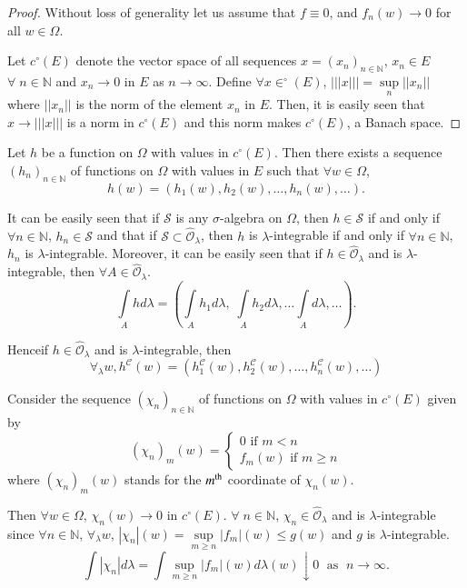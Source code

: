 \begin{proof}
Without loss of generality let us assume that $f\equiv 0$, and $f_n(w)
\to 0$ for all $w \in\Omega$. 

Let $c^\circ (E)$ denote the vector space of all sequences $x =
(x_n)_{n \in \mathbb{N}}$, $x_n \in E$ $\forall \; n \in \mathbb{N}$
and $x_n \to 0$ in $E$ as $n \to \infty$. Define $\forall x \in^\circ
(E)$, $||| x||| = \sup\limits_{n}||x_n||$ where $||x_n||$ is the norm
of the element $x_n$ in $E$. Then, it is easily seen that $x \to
|||x|||$ is a norm in $c^\circ(E)$ and this norm makes $c^\circ(E)$, a
Banach space. 
\end{proof}

Let $h$ be a function on $\Omega$ with values in $c^\circ(E)$. Then
there exists a sequence $(h_n)_{n \in \mathbb{N}}$ of functions on
$\Omega$ with values in $E$ such that $\forall w \in \Omega$, 
$$
h(w) = (h_1 (w), h_2 (w), \ldots, h_n(w), \ldots). 
$$

It can be easily seen that if $\mathcal{S}$ is any $\sigma$-algebra on
$\Omega$, then $h \in \mathcal{S}$ if and only if $\forall n \in
\mathbb{N}$, $h_n \in \mathcal{S}$ and that if $\mathcal{S} \subset
\hat{\mathscr{O}}_\lambda$, then $h$ is $\lambda$-integrable if and
only if $\forall n \in \mathbb{N}$, $h_n$ is
$\lambda$-integrable. Moreover, it can be easily seen that if $h
\in\hat{\mathscr{O}}_\lambda$ and is $\lambda$-integrable, then
$\forall A \in\hat{\mathscr{O}}_\lambda$. 
$$
\int\limits_A hd\lambda = (\int\limits_A h_1 d\lambda, \;
\int\limits_A h_2 d \lambda , \ldots \int\limits_A d \lambda,
\ldots). 
$$

Hence\pageoriginale if $h \in\hat{\mathscr{O}}_\lambda$ and is
$\lambda$-integrable, then 
$$
\forall_\lambda w, h^\mathscr{C} (w) = (h^\mathscr{C}_1 (w),
h^\mathscr{C}_2 (w), \ldots , h^\mathscr{C}_n (w), \ldots )
$$

Consider the sequence $(\chi_n)_{n \in \mathbb{N}}$ of functions on
$\Omega$ with values in $c^\circ(E)$ given by 
$$
(\chi_n)_m(w) = 
\begin{cases}
0 \text{ if } m < n\\
f_m (w) \text{ if } m \geq n  
\end{cases}
$$
where $(\chi_n)_m (w)$ stands for the $m^{\rm th}$ coordinate of
$\chi_n(w)$. 

Then $\forall w \in \Omega$, $\chi_n(w) \to 0 $ in $c^\circ
(E)$. $\forall \; n \in \mathbb{N}$,
$\chi_n\in\hat{\mathscr{O}}_\lambda$ and is $\lambda$-integrable since
$\forall n \in \mathbb{N}$, $\forall_\lambda w$, $|\chi_n|(w) =
\sup\limits_{m \geq n} |f_m| (w) \leq g(w)$ and $g$ is
$\lambda$-integrable. 
$$
\int |\chi_n| d \lambda = \int \sup\limits_{m \geq n} |f_m| (w) d
\lambda(w) \downarrow  0 \; \text{ as } \; n \to \infty. 
$$

